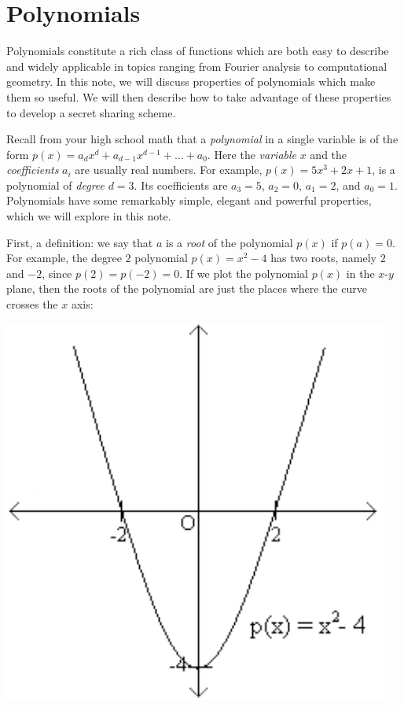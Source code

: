 \documentclass[11pt,fleqn]{article}
\begin{document}
\maketitle




\section*{Polynomials}
Polynomials constitute a rich class of functions which are both easy to 
describe and widely applicable in topics ranging from Fourier analysis
to computational geometry. In this note, we will discuss properties of polynomials
which make them so useful. We will then describe how to take advantage of these
properties to develop a secret sharing scheme. 

Recall from your high school math that a {\it polynomial\/} in a single
variable is of the form $p(x) = a_d x^d + a_{d-1} x^{d-1} + \ldots + a_0$.
Here the {\it variable\/} $x$ and the {\it coefficients\/} $a_i$ are usually 
real numbers. For example, $p(x) = 5x^3 + 2x + 1$, is a polynomial
of {\it degree\/} $d = 3$. Its coefficients are $a_3 = 5$, $a_2 = 0$,
$a_1 = 2$, and $a_0 = 1$. Polynomials have some remarkably simple,
elegant and powerful properties, which we will explore in this note.

First, a definition: we say that $a$ is a {\it root\/} of the polynomial 
$p(x)$ if $p(a) = 0$. For example, the degree $2$
polynomial $p(x) = x^2 - 4$ has two roots, namely $2$ and $-2$, since
$p(2) = p(-2) = 0$. If we plot the polynomial $p(x)$ in the $x$-$y$ plane,
then the roots of the polynomial are just the places where the 
curve crosses the $x$ axis:

\includegraphics[bb = 0 0 140 240, scale = .5]{quad}
\end{document}
